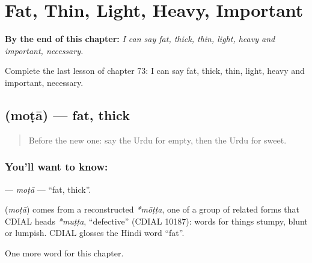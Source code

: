 
\chapter{Fat, Thin, Light, Heavy, Important}
\label{ch:ur-fat-thin-light-heavy-important}

\begin{chapteropening}
\textbf{By the end of this chapter:} \emph{I can say fat, thick, thin, light, heavy and important, necessary.}

Complete the last lesson of chapter 73: I can say fat, thick, thin, light, heavy and important, necessary.
\end{chapteropening}

\section[\texorpdfstring{\ur{موٹا} (moṭā)}{موٹا (moṭā)}]{ (moṭā) — fat, thick}

\label{lesson:UR-C73-mota}



\begin{quote}
Before the new one: say the Urdu for empty, then the Urdu for sweet.
\end{quote}

\subsection*{You'll want to know: }
\textbf{} — \emph{moṭā} — \textquotedblleft{}fat, thick\textquotedblright{}.

\begin{cousinweb}
\textbf{} (\emph{moṭā}) comes from a reconstructed \emph{*mōṭṭa}, one of a group of related forms that CDIAL heads \emph{*muṭṭa}, \textquotedblleft{}defective\textquotedblright{} (CDIAL 10187): words for things stumpy, blunt or lumpish. CDIAL glosses the Hindi word \textquotedblleft{}fat\textquotedblright{}.
\end{cousinweb}

\begin{grammarlens}[title={What you've built}]
One more word for this chapter.
\end{grammarlens}

